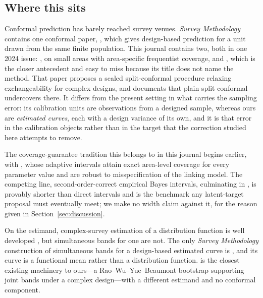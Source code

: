 \subsection{Where this sits}\label{sec:related}

Conformal prediction has barely reached survey venues. \emph{Survey
Methodology} contains one conformal paper, \citet{wieczorek2023design}, which
gives design-based prediction for a unit drawn from the same finite population.
This journal contains two, both in one 2024 issue:
\citet{bersson2024optimal}, on small areas with area-specific frequentist
coverage, and \citet{michal2024model}, which is the closer antecedent and easy
to miss because its title does not name the method. That paper proposes a
scaled split-conformal procedure relaxing exchangeability for complex designs,
and documents that plain split conformal undercovers there. It differs from the
present setting in what carries the sampling error: its calibration units are
observations from a designed sample, whereas ours are \emph{estimated curves},
each with a design variance of its own, and it is that error in the calibration
objects rather than in the target that the correction studied here attempts to
remove.

The coverage-guarantee tradition this belongs to in this journal begins earlier,
with \citet{burris2020exact}, whose adaptive intervals attain exact area-level
coverage for every parameter value and are robust to misspecification of the
linking model. The competing line, second-order-correct empirical Bayes
intervals, culminating in \citet{yoshimori2014second}, is provably shorter than
direct intervals and is the benchmark any latent-target proposal must eventually
meet; we make no width claim against it, for the reason given in
Section~\ref{sec:discussion}.

On the estimand, complex-survey estimation of a distribution function is
well developed \citep{pasquazzi2016comparison,harms2006calibration}, but
simultaneous bands for one are not. The only \emph{Survey Methodology}
construction of simultaneous bands for a design-based estimated curve is
\citet{cardot2013confidence}, and its curve is a functional mean rather than a
distribution function. \citet{koffman2025function} is the closest existing
machinery to ours---a Rao--Wu--Yue--Beaumont bootstrap supporting joint bands
under a complex design---with a different estimand and no conformal component.

